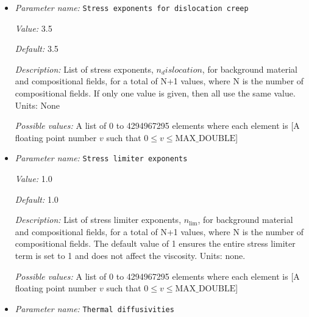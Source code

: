 \begin{itemize}
{\it Value:} 1


{\it Default:} 1


{\it Description:} List of stress exponents, $n_diffusion$, for background material and compositional fields, for a total of N+1 values, where N is the number of compositional fields. If only one value is given, then all use the same value.  Units: None


{\it Possible values:} A list of 0 to 4294967295 elements where each element is [A floating point number $v$ such that $0 \leq v \leq \text{MAX\_DOUBLE}$]
\item {\it Parameter name:} {\tt Stress exponents for dislocation creep}
\label{parameters:Material model/Visco Plastic/Stress exponents for dislocation creep}


{\it Value:} 3.5


{\it Default:} 3.5


{\it Description:} List of stress exponents, $n_dislocation$, for background material and compositional fields, for a total of N+1 values, where N is the number of compositional fields. If only one value is given, then all use the same value.  Units: None


{\it Possible values:} A list of 0 to 4294967295 elements where each element is [A floating point number $v$ such that $0 \leq v \leq \text{MAX\_DOUBLE}$]
\item {\it Parameter name:} {\tt Stress limiter exponents}
\label{parameters:Material model/Visco Plastic/Stress limiter exponents}


{\it Value:} 1.0


{\it Default:} 1.0


{\it Description:} List of stress limiter exponents, $n_\text{lim}$, for background material and compositional fields, for a total of N+1 values, where N is the number of compositional fields. The default value of 1 ensures the entire stress limiter term is set to 1 and does not affect the viscosity. Units: none.


{\it Possible values:} A list of 0 to 4294967295 elements where each element is [A floating point number $v$ such that $0 \leq v \leq \text{MAX\_DOUBLE}$]
\item {\it Parameter name:} {\tt Thermal diffusivities}
\label{parameters:Material model/Visco Plastic/Thermal diffusivities}



\end{itemize}
